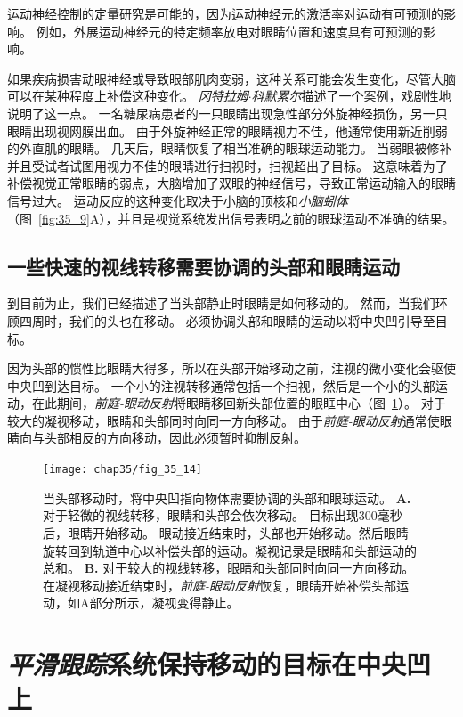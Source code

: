 运动神经控制的定量研究是可能的，因为运动神经元的激活率对运动有可预测的影响。
例如，外展运动神经元的特定频率放电对眼睛位置和速度具有可预测的影响。


如果疾病损害动眼神经或导致眼部肌肉变弱，这种关系可能会发生变化，尽管大脑可以在某种程度上补偿这种变化。
\textit{冈特拉姆$\cdot$科默累尔}描述了一个案例，戏剧性地说明了这一点。
一名糖尿病患者的一只眼睛出现急性部分外旋神经损伤，另一只眼睛出现视网膜出血。
由于外旋神经正常的眼睛视力不佳，他通常使用新近削弱的外直肌的眼睛。
几天后，眼睛恢复了相当准确的眼球运动能力。
当弱眼被修补并且受试者试图用视力不佳的眼睛进行扫视时，扫视超出了目标。
这意味着为了补偿视觉正常眼睛的弱点，大脑增加了双眼的神经信号，导致正常运动输入的眼睛信号过大。
运动反应的这种变化取决于小脑的顶核和\textit{小脑蚓体}（图~\ref{fig:35_9}A），并且是视觉系统发出信号表明之前的眼球运动不准确的结果。



\subsection{一些快速的视线转移需要协调的头部和眼睛运动}

到目前为止，我们已经描述了当头部静止时眼睛是如何移动的。
然而，当我们环顾四周时，我们的头也在移动。
必须协调头部和眼睛的运动以将中央凹引导至目标。


因为头部的惯性比眼睛大得多，所以在头部开始移动之前，注视的微小变化会驱使中央凹到达目标。
一个小的注视转移通常包括一个扫视，然后是一个小的头部运动，在此期间，\textit{前庭-眼动反射}将眼睛移回新头部位置的眼眶中心（图~\ref{fig:35_14}）。
对于较大的凝视移动，眼睛和头部同时向同一方向移动。
由于\textit{前庭-眼动反射}通常使眼睛向与头部相反的方向移动，因此必须暂时抑制反射。


\begin{figure}[htbp]
	\centering
	\texttt{[image: chap35/fig\_35\_14]}
	\caption{当头部移动时，将中央凹指向物体需要协调的头部和眼球运动。
		\textbf{A.} 对于轻微的视线转移，眼睛和头部会依次移动。
		目标出现300毫秒后，眼睛开始移动。
		眼动接近结束时，头部也开始移动。然后眼睛旋转回到轨道中心以补偿头部的运动。凝视记录是眼睛和头部运动的总和\cite{zee1977disorders}。
		\textbf{B.} 对于较大的视线转移，眼睛和头部同时向同一方向移动。
		在凝视移动接近结束时，\textit{前庭-眼动反射}恢复，眼睛开始补偿头部运动，如A部分所示，凝视变得静止\cite{laurutis1986vestibulo}。}
	\label{fig:35_14}
\end{figure}



\section{\textit{平滑跟踪}系统保持移动的目标在中央凹上}

